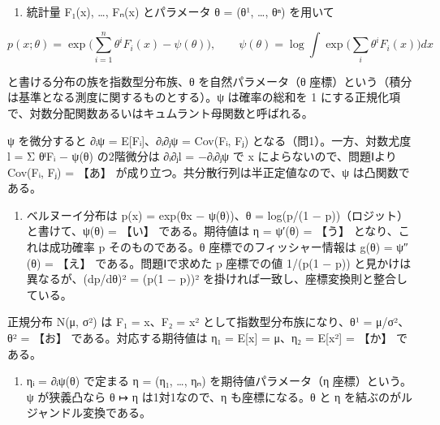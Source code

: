 \documentclass[
  10pt,
  a4paper,
]{article}
\providecommand{\tightlist}{%
  \setlength{\itemsep}{0pt}\setlength{\parskip}{0pt}}
\begin{document}
\begin{enumerate}
\def\labelenumi{(\arabic{enumi})}
\tightlist
\item
  統計量 F{\fallbackfont ₁}(x), \ldots, F{\fallbackfont ₙ}(x)
  とパラメータ θ = (θ¹, \ldots, θ{\fallbackfont ⁿ}) を用いて
\end{enumerate}

\[p(x;\theta) = \exp\Big( \sum_{i=1}^{n} \theta^i F_i(x) - \psi(\theta) \Big), \qquad \psi(\theta) = \log \int \exp\Big( \sum_i \theta^i F_i(x) \Big) dx\]

と書ける分布の族を指数型分布族、θ を自然パラメータ（θ
座標）という（積分は基準となる測度に関するものとする）。ψ は確率の総和を
1 にする正規化項で、対数分配関数あるいはキュムラント母関数と呼ばれる。

ψ を微分すると ∂{\fallbackfont ᵢ}ψ =
E{[}F{\fallbackfont ᵢ}{]}、∂{\fallbackfont ᵢ}∂{\fallbackfont ⱼ}ψ =
Cov(F{\fallbackfont ᵢ}, F{\fallbackfont ⱼ})
となる（問1）。一方、対数尤度 l = Σ θ{\fallbackfont ⁱ}F{\fallbackfont ᵢ}
− ψ(θ) の2階微分は ∂{\fallbackfont ᵢ}∂{\fallbackfont ⱼ}l =
−∂{\fallbackfont ᵢ}∂{\fallbackfont ⱼ}ψ で x によらないので、問題Ⅰより
Cov(F{\fallbackfont ᵢ}, F{\fallbackfont ⱼ}) = 【あ】
が成り立つ。共分散行列は半正定値なので、ψ は凸関数である。

\begin{enumerate}
\def\labelenumi{(\arabic{enumi})}
\setcounter{enumi}{1}
\tightlist
\item
  ベルヌーイ分布は p(x) = exp(θx − ψ(θ))、θ = log(p/(1 −
  p))（ロジット）と書けて、ψ(θ) = 【い】 である。期待値は η = ψ′(θ) =
  【う】 となり、これは成功確率 p そのものである。θ
  座標でのフィッシャー情報は g(θ) = ψ″(θ) = 【え】 である。問題Ⅰで求めた
  p 座標での値 1/(p(1 − p)) と見かけは異なるが、(dp/dθ)² = (p(1 − p))²
  を掛ければ一致し、座標変換則と整合している。
\end{enumerate}

正規分布 N(μ, σ²) は F{\fallbackfont ₁} = x、F{\fallbackfont ₂} = x²
として指数型分布族になり、θ¹ = μ/σ²、θ² = 【お】
である。対応する期待値は η{\fallbackfont ₁} = E{[}x{]} =
μ、η{\fallbackfont ₂} = E{[}x²{]} = 【か】 である。

\begin{enumerate}
\def\labelenumi{(\arabic{enumi})}
\setcounter{enumi}{2}
\tightlist
\item
  η{\fallbackfont ᵢ} = ∂{\fallbackfont ᵢ}ψ(θ) で定まる η =
  (η{\fallbackfont ₁}, \ldots, η{\fallbackfont ₙ}) を期待値パラメータ（η
  座標）という。ψ が狭義凸なら θ {\fallbackfont ↦} η は1対1なので、η
  も座標になる。θ と η を結ぶのがルジャンドル変換である。
\end{enumerate}
\end{document}
